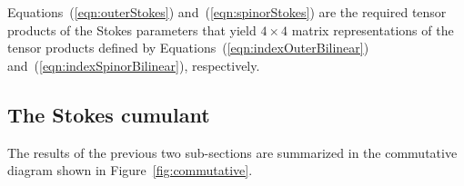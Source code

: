 \documentclass[twocolumn]{aastex6}
\newcommand{\Eqns}[3]{Equations~(\ref{eqn:#1}) #2~(\ref{eqn:#3})}
\newcommand{\Fig}[1]{Figure~\ref{fig:#1}}
\begin{document}
\Eqns{outerStokes}{and}{spinorStokes} are the required tensor products
of the Stokes parameters that yield $4\times4$ matrix representations
of the tensor products defined by
\Eqns{indexOuterBilinear}{and}{indexSpinorBilinear}, respectively.



\subsection{The Stokes cumulant}

The results of the previous two sub-sections are summarized in the
commutative diagram shown in \Fig{commutative}.
%
\end{document}
